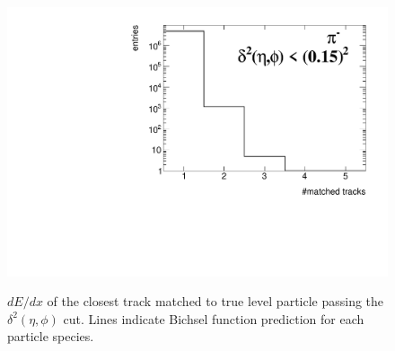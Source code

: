 \begin{figure}[h!]
{		\includegraphics[width=\linewidth,page=26]{graphics/eff/trackSplitting_QualityEtaPhiCD.pdf}\\
	}%
	\caption[$dE/dx$ of the closest track matched to true level particle passing the $\delta^{2}\left(\eta,\phi\right)$ cut.]{$dE/dx$ of the closest track matched to true level particle passing the $\delta^{2}\left(\eta,\phi\right)$ cut. Lines indicate Bichsel function prediction for each particle species.}\label{fig:trackSplittingEtaPhidEdx}
\end{figure}

